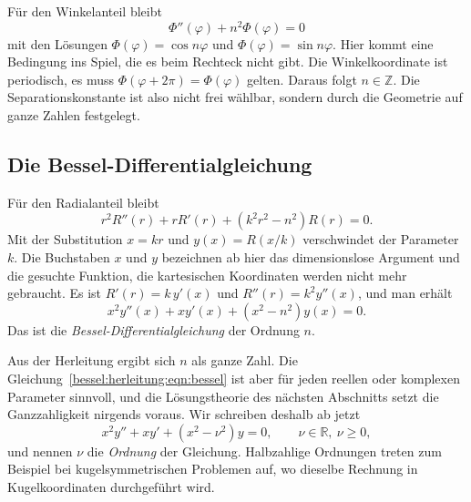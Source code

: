 Für den Winkelanteil bleibt
\begin{equation}
\Phi''(\varphi) + n^2\Phi(\varphi) = 0
\label{bessel:herleitung:eqn:winkel}
\end{equation}
mit den Lösungen $\Phi(\varphi)=\cos n\varphi$ und $\Phi(\varphi)=\sin n\varphi$.
Hier kommt eine Bedingung ins Spiel, die es beim Rechteck nicht gibt.
Die Winkelkoordinate ist periodisch, es muss $\Phi(\varphi+2\pi)=\Phi(\varphi)$ gelten.
Daraus folgt $n\in\mathbb{Z}$.
Die Separationskonstante ist also nicht frei wählbar, sondern durch die Geometrie auf ganze Zahlen festgelegt.

%
%
\subsection{Die Bessel-Differentialgleichung
\label{bessel:herleitung:subsection:besseldgl}}
Für den Radialanteil bleibt
\begin{equation}
r^2R''(r) + rR'(r) + (k^2r^2-n^2)R(r) = 0.
\label{bessel:herleitung:eqn:radial}
\end{equation}
Mit der Substitution $x=kr$ und $y(x)=R(x/k)$ verschwindet der Parameter $k$.
Die Buchstaben $x$ und $y$ bezeichnen ab hier das dimensionslose Argument und die gesuchte Funktion, die kartesischen Koordinaten werden nicht mehr gebraucht.
Es ist $R'(r)=k\,y'(x)$ und $R''(r)=k^2y''(x)$, und man erhält
\begin{equation}
x^2y''(x) + xy'(x) + (x^2-n^2)y(x) = 0.
\label{bessel:herleitung:eqn:bessel}
\end{equation}
Das ist die \emph{Bessel-Differentialgleichung}
%
der Ordnung $n$.

Aus der Herleitung ergibt sich $n$ als ganze Zahl.
Die Gleichung~\eqref{bessel:herleitung:eqn:bessel} ist aber für jeden reellen oder komplexen Parameter sinnvoll, und die Lösungstheorie des nächsten Abschnitts setzt die Ganzzahligkeit nirgends voraus.
Wir schreiben deshalb ab jetzt
\begin{equation}
x^2y'' + xy' + (x^2-\nu^2)y = 0,
\qquad
\nu \in \mathbb{R},\ \nu \ge 0,
\label{bessel:herleitung:eqn:besselnu}
\end{equation}
und nennen $\nu$ die \emph{Ordnung}
%
der Gleichung.
Halbzahlige Ordnungen treten zum Beispiel bei kugelsymmetrischen Problemen auf, wo dieselbe Rechnung in Kugelkoordinaten durchgeführt wird.

